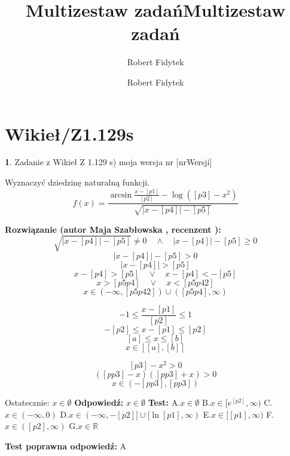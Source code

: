\documentclass[12pt, a4paper]{article}
\title{Multizestaw zadań}
\author{Robert Fidytek}
\date{}\documentclass[12pt, a4paper]{article}
\title{Multizestaw zadań}
\author{Robert Fidytek}
\date{}
\theoremstyle{definition} %
\newtheorem{zad}{}
\theoremstyle{definition} %
\newtheorem{zad}{}
\newcommand{\kategoria}[1]{\section{#1}} %
\newcommand{\zadStart}[1]{\begin{zad}#1\newline} %
\newcommand{\zadStop}{\end{zad}}   %
\newcommand{\rozwStart}[2]{\noindent \textbf{Rozwiązanie (autor #1 , recenzent #2): }\newline} %
\newcommand{\rozwStop}{\newline}                                            %
\newcommand{\odpStart}{\noindent \textbf{Odpowiedź:}\newline}    %
\newcommand{\odpStop}{\newline}                                             %
\newcommand{\testStart}{\noindent \textbf{Test:}\newline} %
\newcommand{\testStop}{\newline} %
\newcommand{\kluczStart}{\noindent \textbf{Test poprawna odpowiedź:}\newline} %
\newcommand{\kluczStop}{\newline} %
\begin{document}
\maketitle


\kategoria{Wikieł/Z1.129s}
\zadStart{Zadanie z Wikieł Z 1.129 s) moja wersja nr [nrWersji]}

Wyznaczyć dziedzinę naturalną funkcji.
$$f(x)=\frac{\arcsin\frac{x-[p1]}{[p2]}-\log([p3]-x^{2})}{\sqrt{|x-[p4]|-[p5]}}$$
\zadStop

\rozwStart{Maja Szabłowska}{}
$$\sqrt{|x-[p4]|-[p5]}\neq 0 \quad \land \quad |x-[p4]|-[p5]\geq0$$
$$|x-[p4]|-[p5]>0$$
$$|x-[p4]|>[p5]$$
$$x-[p4]>[p5]\quad \lor  \quad x-[p4]<-[p5]$$
$$x>[p5p4] \quad \lor  \quad x<[p5p42]$$
$$x\in (-\infty, [p5p42])\cup([p5p4],\infty)$$

$$-1\leq\frac{x-[p1]}{[p2]}\leq 1$$
$$-[p2]\leq x-[p1]\leq [p2]$$
$$[a]\leq x \leq [b]$$
$$x\in [[a],[b]]$$

$$[p3]-x^{2} > 0$$
$$([pp3]-x)([pp3]+x)>0$$
$$x\in(-[pp3],[pp3])$$

Ostatecznie: $x\in\emptyset$
\rozwStop
\odpStart
$x\in\emptyset$
\odpStop
\testStart
A.$x\in\emptyset$
B.$x\in[e^{[p2]},\infty)$
C.$x\in(-\infty, 0)$
D.$x\in(-\infty, -[p2]] \cup [\ln[p1],\infty)$
E.$x\in[[p1],\infty)$
F.$x\in([p2],\infty)$
G.$x\in\mathbb{R}$

\testStop
\kluczStart
A
\kluczStop
\end{document}
